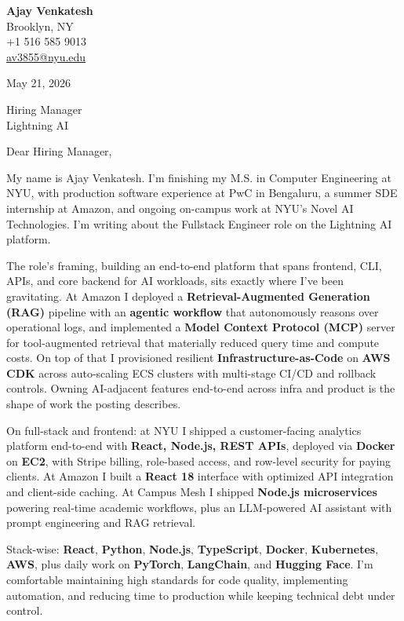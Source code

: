 \documentclass[letterpaper,11pt]{article}
\begin{document}
\begin{flushleft}
\textbf{\large Ajay Venkatesh} \\
Brooklyn, NY \\
+1 516 585 9013 \\
\href{mailto:av3855@nyu.edu}{av3855@nyu.edu}
\end{flushleft}
\vspace{10pt}
May 21, 2026
\vspace{6pt}

Hiring Manager \\
Lightning AI

\vspace{10pt}

Dear Hiring Manager,

My name is Ajay Venkatesh. I'm finishing my M.S. in Computer Engineering at NYU, with production software experience at PwC in Bengaluru, a summer SDE internship at Amazon, and ongoing on-campus work at NYU's Novel AI Technologies. I'm writing about the Fullstack Engineer role on the Lightning AI platform.

The role's framing, building an end-to-end platform that spans frontend, CLI, APIs, and core backend for AI workloads, sits exactly where I've been gravitating. At Amazon I deployed a \textbf{Retrieval-Augmented Generation (RAG)} pipeline with an \textbf{agentic workflow} that autonomously reasons over operational logs, and implemented a \textbf{Model Context Protocol (MCP)} server for tool-augmented retrieval that materially reduced query time and compute costs. On top of that I provisioned resilient \textbf{Infrastructure-as-Code} on \textbf{AWS CDK} across auto-scaling ECS clusters with multi-stage CI/CD and rollback controls. Owning AI-adjacent features end-to-end across infra and product is the shape of work the posting describes.

On full-stack and frontend: at NYU I shipped a customer-facing analytics platform end-to-end with \textbf{React, Node.js, REST APIs}, deployed via \textbf{Docker} on \textbf{EC2}, with Stripe billing, role-based access, and row-level security for paying clients. At Amazon I built a \textbf{React 18} interface with optimized API integration and client-side caching. At Campus Mesh I shipped \textbf{Node.js microservices} powering real-time academic workflows, plus an LLM-powered AI assistant with prompt engineering and RAG retrieval.

Stack-wise: \textbf{React}, \textbf{Python}, \textbf{Node.js}, \textbf{TypeScript}, \textbf{Docker}, \textbf{Kubernetes}, \textbf{AWS}, plus daily work on \textbf{PyTorch}, \textbf{LangChain}, and \textbf{Hugging Face}. I'm comfortable maintaining high standards for code quality, implementing automation, and reducing time to production while keeping technical debt under control.
\end{document}
